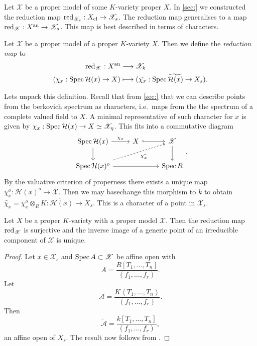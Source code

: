 Let $\mathscr X$ be a proper model of some $K$-variety proper $X$.
In \cref{sec:} we constructed the reduction map $\operatorname{red}_{\mathscr X_s}: X_\text{cl}  \to \mathscr X_s$. 
The reduction map generalises to a map $\operatorname{red}_{\mathscr X}: X{}^{\text{an}} \to \mathscr X_s$.
This map is best described in terms of characters. 
\begin{definition}
	Let $\mathscr X$ be a proper model of a proper $K$-variety $X$. 
	Then we define the \emph{reduction map} to 
	\begin{align*}
		\operatorname{red}_{\mathscr X}:  X{}^{\text{an}} &\longrightarrow \mathscr X_k \\
		(\chi_x: \operatorname{Spec} \mathcal H(x) \to X) &\longmapsto (\tilde{\chi_x}: \operatorname{Spec} \widetilde{\mathcal H (x)} \to X_s)
	.\end{align*}
\end{definition}
Lets unpack this definition. 
Recall that from \cref{sec:} that we can describe points from the berkovich spectrum as characters, i.e.\ maps from the the spectrum of a complete valued field to $X$.
A minimal representative of such character for $x$ is given by $\chi_x: \operatorname{Spec} \mathcal{H} (x) \to X \simeq \mathscr X_\eta$. 
This fits into a commutative diagram \[
\begin{tikzcd}
	\spec \mathcal{H} (x) \dar \rar{\chi_x} & X \rar[hookrightarrow] & \mathscr X \dar \\ 
	\spec \mathcal{H} (x)^{o} \ar[dashed]{urr}[']{\chi_x^{o}} \ar{rr} & & \spec R
\end{tikzcd}
.\] 
By the valuative criterion of properness there exists a unique map $\chi_x^{o}: \mathcal{H} (x)^{o} \to \mathscr X$. 
Then we may basechange this morphism to  $k$ to obtain $\widetilde{\chi_x} = \chi_x^{o} \otimes_R K: \widetilde{\mathcal{H} (x)} \to X_s$. 
This is a character of a point in $\mathscr X_s$. 


\begin{proposition}
	Let $X$ be a proper $K$-variety with a proper model $\mathscr X$. 
	Then the reduction map  $\operatorname{red}_{\mathscr X}$ is surjective and the inverse image of a generic point of an irreducible component of $\mathscr X$ is unique. 
\end{proposition}
\begin{proof}
	Let $x \in \mathscr X_s$ and  $\operatorname{Spec} A \subset \mathscr X$ be affine open with \[
		A = \frac{R[T_1, \ldots, T_n]}{(f_1, \ldots, f_r)}
	.\] 
	Let \[
		\mathcal{A}  = \frac{K\left<T_1, \ldots, T_n \right>}{(f_1, \ldots, f_r)}
	.\] 
	Then \[
		\widetilde{\mathcal{A} } = \frac{k[T_1,\ldots, T_n]}{(f_1, \ldots, f_r)}
	,\]  
	an affine open of $X_s$. 
	The result now follows from \cite[prop.\ 2.4.4]{berkovichSpectralTheoryAnalytic2012}.
\end{proof}



